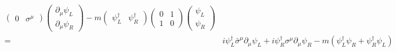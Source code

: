 \begin{subappendices}
\begin{align}
\begin{pmatrix}
   0&\sigma^\mu
 \end{pmatrix} \begin{pmatrix}
   \partial_\mu\psi_L\\
   \partial_\mu\psi_R
 \end{pmatrix}-m
 \begin{pmatrix}
   \psi_L^\dagger&\psi_R^\dagger
 \end{pmatrix}
 \begin{pmatrix}
   0&1\\
   1&0
 \end{pmatrix}
 \begin{pmatrix}
   \psi_L\\ \psi_R
 \end{pmatrix}\nonumber\\
 =& i\psi_L^\dagger \bar{\sigma}^\mu\partial_\mu\psi_L+i\psi_R^\dagger \sigma^\mu\partial_\mu\psi_R
  -m(\psi_L^\dagger \psi_R+\psi_R^\dagger \psi_L)
\end{align}


\end{subappendices}
